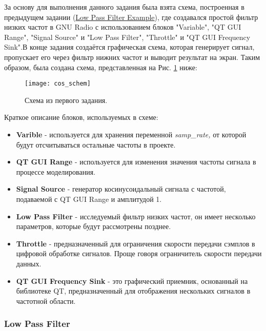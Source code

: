 \documentclass[a4paper,12pt]{extarticle}
\begin{document}
\hspace{1.15cm}За основу для выполнения данного задания была взята схема, построенная в предыдущем 
задании (\href{https://wiki.gnuradio.org/index.php?title=Low_Pass_Filter_Example}
{Low Pass Filter Example}), где создавался простой фильтр низких частот в GNU Radio с 
использованием блоков "Variable", "QT GUI Range", "Signal Source" и "Low Pass Filter", 
"Throttle" и "QT GUI Frequency Sink".В конце задания создаётся графическая схема, которая 
генерирует сигнал, пропускает его через фильтр нижних частот и выводит результат на 
экран. Таким образом, была создана схема, представленная на Рис. \ref{fig:cos_schem} ниже:\\
\begin{figure}[H]
    \centering
    \texttt{[image: cos\_schem]}
    \caption{Схема из первого задания.} %
    \label{fig:cos_schem} %
\end{figure}
Краткое описание блоков, используемых в схеме:
\begin{itemize}[nolistsep]
    \item \textbf{Varible} - используется для хранения переменной \textit{samp\_rate,} 
    от которой будут отсчитываться остальные частоты в проекте.
    \item \textbf{QT GUI Range} - используется для изменения значения частоты сигнала
    в процессе моделирования.
    \item \textbf{Signal Source} - генератор косинусоидальный сигнала с частотой, подаваемой
    с QT GUI Range и амплитудой 1.
    \item \textbf{Low Pass Filter} - исследуемый фильтр низких частот, он имеет несколько параметров, 
    которые будут рассмотрены позднее. 
    \item \textbf{Throttle} - предназначенный для ограничения скорости передачи сэмплов в цифровой 
    обработке сигналов. Проще говоря ограничитель скорости передачи данных. 
    \item \textbf{QT GUI Frequency Sink} - это графический приемник, основанный на библиотеке QT, 
    предназначенный для отображения нескольких сигналов в частотной области.
\end{itemize}
\vspace{0.5cm}

\newpage
\subsubsection{Low Pass Filter}
\end{document}
